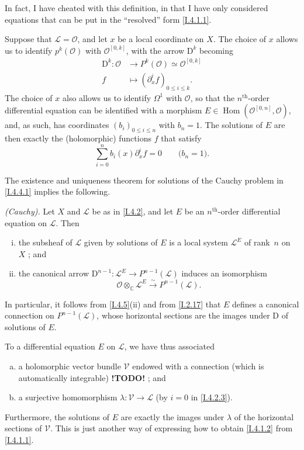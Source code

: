 \documentclass{report}
\theoremstyle{plain}
\newenvironment{theorem}[1]
    {\renewcommand\theinnercustomtheorem{#1}\innercustomtheorem}
    {\endinnercustomlemma}
\theoremstyle{definition}
\newenvironment{env}[1]
    {\renewcommand\theinnercustomenv{#1}\innercustomenv}
    {\endinnercustomenv}
\newcommand{\sh}{\mathscr}
\newcommand{\CC}{\mathbb{C}}
\newcommand{\DD}{\mathrm{D}}
\renewcommand{\leq}{\leqslant}
\DeclareMathOperator{\Hom}{Hom}
\newcommand{\todo}{\textbf{ !TODO! }}
\newcommand{\oldpage}[1]{\marginpar{\footnotesize$\Big\vert$ \textit{p.~#1}}}
\begin{document}
In fact, I have cheated with this definition, in that I have only considered equations that can be put in the ``resolved'' form \cref{I.4.1.1}.

\oldpage{25}
\begin{env}{4.4}
\label{I.4.4}
  Suppose that $\sh{L}=\sh{O}$, and let $x$ be a local coordinate on $X$.
  The choice of $x$ allows us to identify $p^k(\sh{O})$ with $\sh{O}^{[0,k]}$, with the arrow $\DD^k$ becoming
  \[
    \begin{aligned}
      \DD^k\colon \sh{O} &\to P^k(\sh{O}) \simeq \sh{O}^{[0,k]}
    \\f &\mapsto (\partial_x^i f)_{0\leq i\leq k}.
    \end{aligned}
  \]
  The choice of $x$ also allows us to identify $\Omega^1$ with $\sh{O}$, so that the $n^\mathrm{th}$-order differential equation can be identified with a morphism $E\in\Hom(\sh{O}^{[0,n]},\sh{O})$, and, as such, has coordinates $(b_i)_{0\leq i\leq n}$ with $b_n=1$.
  The solutions of $E$ are then exactly the (holomorphic) functions $f$ that satisfy
  \[
  \label{I.4.4.1}
    \sum_{i=0}^n b_i(x) \partial_x^i f = 0
    \qquad\mbox{($b_n=1$).}
  \tag{4.4.1}
  \]

  The existence and uniqueness theorem for solutions of the Cauchy problem in \cref{I.4.4.1} implies the following.
\end{env}

\begin{theorem}{4.5}
\label{I.4.5}
  \emph{(Cauchy).}
  Let $X$ and $\sh{L}$ be as in \cref{I.4.2}, and let $E$ be an $n^\mathrm{th}$-order differential equation on $\sh{L}$.
  Then
  \begin{enumerate}[(i)]
    \item the subsheaf of $\sh{L}$ given by solutions of $E$ is a local system $\sh{L}^E$ of rank~$n$ on $X$ ; and
    \item the canonical arrow $\DD^{n-1}\colon\sh{L}^E \to P^{n-1}(\sh{L})$ induces an isomorphism
      \[
        \sh{O}\otimes_\CC\sh{L}^E \xrightarrow{\sim} P^{n-1}(\sh{L}).
      \]
  \end{enumerate}
\end{theorem}

In particular, it follows from \cref{I.4.5}(ii) and from \cref{I.2.17} that $E$ defines a canonical connection on $P^{n-1}(\sh{L})$, whose horizontal sections are the images under $\DD$ of solutions of $E$.

\begin{env}{4.6}
\label{I.4.6}
  To a differential equation $E$ on $\sh{L}$, we have thus associated
  \begin{enumerate}[a)]
    \item a holomorphic vector bundle $\sh{V}$ endowed with a connection (which is automatically integrable) \todo ; and
    \item a surjective homomorphism $\lambda\colon\sh{V}\to\sh{L}$ (by $i=0$ in \cref{I.4.2.3}).
  \end{enumerate}
  Furthermore, the solutions of $E$ are exactly the images under $\lambda$ of the horizontal sections of $\sh{V}$.
  This is just another way of expressing how to obtain \cref{I.4.1.2} from \cref{I.4.1.1}.
\end{env}
\end{document}
